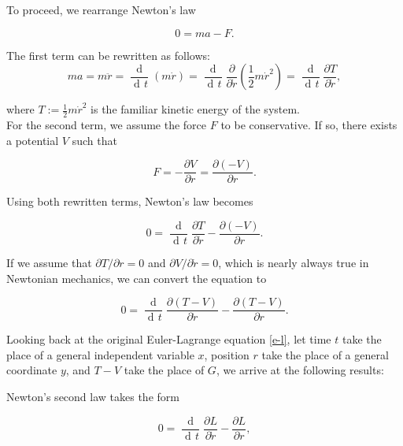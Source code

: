 \documentclass{article}
\DeclareMathOperator{\dd}{d\!}
\DeclareMathOperator{\ddd}{\mathrm{d}}
\begin{document}
To proceed, we rearrange Newton's law

\begin{equation}
0 = ma - F.
\end{equation}

The first term can be rewritten as follows:
\begin{equation}
ma = m \ddot{r} = \frac{\ddd}{\dd t} (m \dot{r})
= \frac{\ddd}{\dd t} \frac{\partial}{\partial \dot{r}} \left(\frac{1}{2} m \dot{r}^2 \right)
= \frac{\ddd}{\dd t} \frac{\partial T}{\partial \dot{r}},
\end{equation}

where $T:=\frac{1}{2} m \dot{r}^2$ is the familiar kinetic energy of the system. \\

For the second term, we assume the force $F$ to be conservative. If so, there exists a potential $V$ such that

\begin{equation}
F = - \frac{\partial V}{\partial r} = \frac{\partial (-V)}{\partial r}.
\end{equation}

Using both rewritten terms, Newton's law becomes


\begin{equation}
0 = \frac{\ddd}{\dd t} \frac{\partial T}{\partial \dot{r}} - \frac{\partial (-V)}{\partial r}.
\end{equation}


If we assume that $\partial T/ \partial r = 0$ and $\partial V / \partial \dot{r} = 0$, which is nearly always true in Newtonian mechanics, we can convert the equation to


\begin{equation}
0 = \frac{\ddd}{\dd t} \frac{\partial (T-V)}{\partial \dot{r}} - \frac{\partial (T-V)}{\partial r}.
\end{equation}

Looking back at the original Euler-Lagrange equation \eqref{e-l}, let time $t$ take the place of a general independent variable $x$, position $r$ take the place of a general coordinate $y$, and $T-V$ take the place of $G$, we arrive at the following results:

Newton's second law takes the form

\begin{equation}
0 = \frac{\ddd}{\dd t} \frac{\partial L}{\partial \dot{r}} - \frac{\partial L}{\partial r},
\end{equation}
\end{document}
